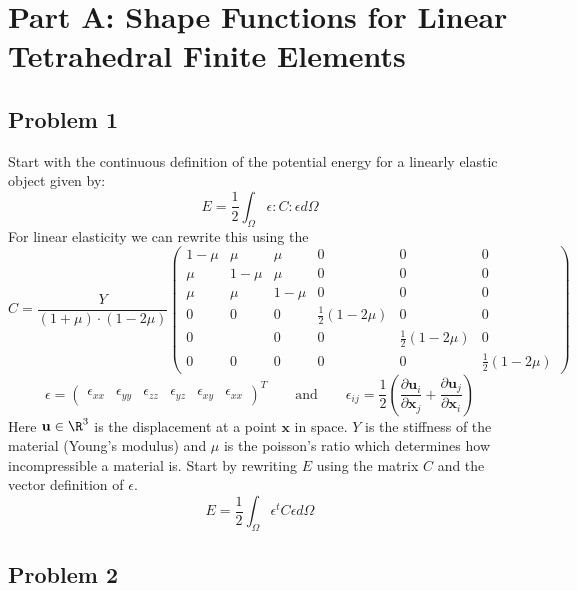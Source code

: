 \documentclass[11pt]{article}
\begin{document}
\section*{Part A: Shape Functions for Linear Tetrahedral Finite Elements}

\subsection*{Problem 1}
Start with the continuous definition of the potential energy for a linearly elastic object given by:
\[
    E=\frac{1} {2}\int_\Omega \epsilon\colon C \colon\epsilon d\Omega    
\]
For linear elasticity we can rewrite this using the
\[
    C=\frac{Y}{(1+\mu)\cdot(1-2\mu)}
    \begin{pmatrix} 
        1-\mu & \mu & \mu & 0 &0 &0 \\
        \mu & 1-\mu & \mu & 0 &0 &0 \\
        \mu & \mu & 1-\mu & 0 & 0 &0 \\ 
        0 & 0 & 0 & \frac{1}{2}(1-2\mu) &0 &0 \\
        0 & & 0 & 0 &\frac{1} {2}(1-2\mu) &0 \\
        0 & 0 & 0 & 0 &0 &\frac{1}{2}(1-2\mu) 
    \end{pmatrix}    
\]
\[
    \epsilon= 
    \begin{pmatrix}
        \epsilon_{xx} & \epsilon_{yy} & \epsilon_{zz} &\epsilon_{yz} & \epsilon_{xy} & \epsilon_{xx}
    \end{pmatrix}^T 
    \quad \quad \text{and} \quad \quad
    \epsilon_{ij} =
    \frac{1}{2}\left(\frac{\partial \mathbf{u}_i}{\partial\mathbf{x}_j}+\frac{\partial \mathbf{u}_j}{\partial \mathbf{x}_i}\right) 
\]
Here $\mathbf{u} \in \R^3$ is the displacement at a point $\mathbf{x}$ in space. $Y$ is the stiffness of the material (Young's modulus) and $\mu$ is the poisson's ratio which determines how incompressible a material is. Start by rewriting $E$ using the matrix $C$ and the vector definition of $\epsilon$.
\[
    E = \frac{1}{2} \int_{\Omega} \epsilon^t C \epsilon d\Omega    
\]
  
 
\subsection*{Problem 2}
\end{document}
